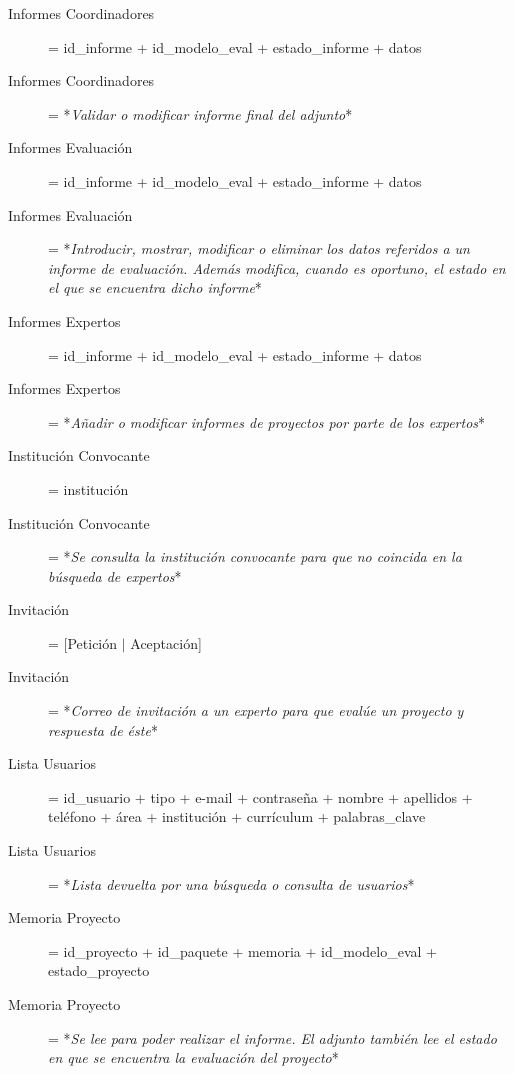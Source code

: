 \documentclass[12pt,a4paper,titlepage,spanish,twoside]{book}
\begin{document}
\begin{description}
\item[Informes Coordinadores] = id\_informe + id\_modelo\_eval +
  estado\_informe + datos 

\item[Informes Coordinadores] = *\emph{Validar o modificar informe final del
    adjunto}* 

\item[Informes Evaluación] = id\_informe + id\_modelo\_eval + estado\_informe
  + datos 

\item[Informes Evaluación] = *\emph{Introducir, mostrar, modificar o eliminar
    los datos referidos a un informe de evaluación. Además modifica, cuando
    es oportuno, el estado en el que se encuentra dicho informe}* 

\item[Informes Expertos] = id\_informe + id\_modelo\_eval + estado\_informe +
  datos 

\item[Informes Expertos] = *\emph{Añadir o modificar informes de proyectos
    por parte de los expertos}* 

\item[Institución Convocante] = institución

\item[Institución Convocante] = *\emph{Se consulta la institución convocante
    para que no coincida en la búsqueda de expertos}* 

\item[Invitación] = [Petición $\mid$ Aceptación]

\item[Invitación] = *\emph{Correo de invitación a un experto para que evalúe
    un proyecto y respuesta de éste}* 

\item[Lista Usuarios] = {id\_usuario + tipo + e-mail + contraseña + nombre +
    apellidos + teléfono + área + institución + currículum +
    {palabras\_clave}} 

\item[Lista Usuarios] = *\emph{Lista devuelta por una búsqueda o consulta de
    usuarios}* 

\item[Memoria Proyecto] = id\_proyecto + id\_paquete + memoria +
  id\_modelo\_eval + estado\_proyecto 

\item[Memoria Proyecto] = *\emph{Se lee para poder realizar el informe. El
    adjunto también lee el estado en que se encuentra la evaluación del
    proyecto}* 


\end{description}
\end{document}
